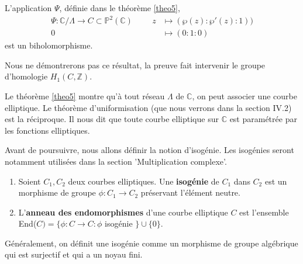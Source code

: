 \documentclass[a4paper]{article}
\begin{document}
\begin{theorem}
L'application $\Psi$, définie dans le théorème \ref{theo5},
\begin{align*}
\Psi : \mathbb{C} / \Lambda \rightarrow C \subset \mathbb{P}^2(\mathbb{C})   \hspace{1cm} z &\mapsto (\wp(z):\wp'(z):1)) \\ 0&\mapsto (0:1:0)
\end{align*}
est un biholomorphisme.
\end{theorem}
\noindent 
Nous ne démontrerons pas ce résultat, la preuve fait intervenir le groupe d'homologie $H_{1}(C,\mathbb{Z})$. \\

\begin{rem}\label{rem1}
\normalfont Le théorème \ref{theo5} montre qu'à tout réseau $\Lambda$ de $\mathbb{C}$, on peut associer une courbe elliptique. Le théorème d'uniformisation (que nous verrons dans la section IV.2) est la réciproque. Il nous dit que toute courbe elliptique sur $\mathbb{C}$ est paramétrée par les fonctions elliptiques.
\end{rem}

\noindent Avant de poursuivre, nous allons définir la notion d'isogénie. Les isogénies seront notamment utilisées dans la section 'Multiplication complexe'.

\begin{definition}
\begin{enumerate}
\item
Soient $C_{1},C_{2}$ deux courbes elliptiques.
Une \textbf{isogénie} de $C_{1}$ dans $C_{2}$ est un morphisme de groupe $\phi : C_{1} \rightarrow C_{2}$ préservant l'élément neutre.
\item L'\textbf{anneau des endomorphismes} d'une courbe elliptique $C$ est l'ensemble End($C)=\{ \phi :C \rightarrow C : \phi$ isogénie $\} \cup \{0\}$.
\end{enumerate}
\end{definition}

\begin{rem}
Généralement, on définit une isogénie comme un morphisme de groupe algébrique qui est surjectif et qui a un noyau fini.
\end{rem}
\end{document}
